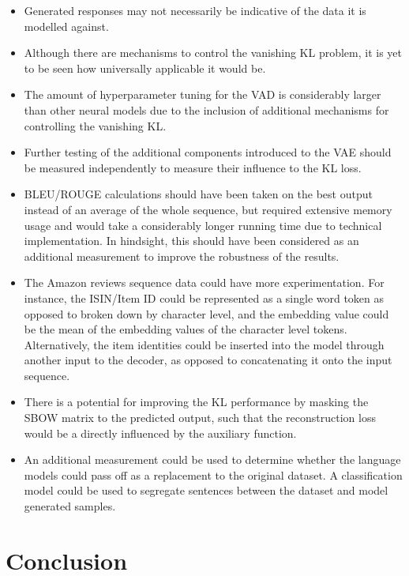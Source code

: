 \documentclass[12pt,twoside]{report}
\begin{document}
\begin{itemize}  
\item Generated responses may not necessarily be indicative of the data it is modelled against.
\item Although there are mechanisms to control the vanishing KL problem, it is yet to be seen how universally applicable it would be.
\item The amount of hyperparameter tuning for the VAD is considerably larger than other neural models due to the inclusion of additional mechanisms for controlling the vanishing KL.
\item Further testing of the additional components introduced to the VAE should be measured independently to measure their influence to the KL loss. 
\item BLEU/ROUGE calculations should have been taken on the best output instead of an average of the whole sequence, but required extensive memory usage and would take a considerably longer running time due to technical implementation. In hindsight, this should have been considered as an additional measurement to improve the robustness of the results.
\item The Amazon reviews sequence data could have more experimentation. For instance, the ISIN/Item ID could be represented as a single word token as opposed to broken down by character level, and the  embedding value could be the mean of the embedding values of the character level tokens. Alternatively, the item identities could be inserted into the model through another input to the decoder, as opposed to concatenating it onto the input sequence. 
\item There is a potential for improving the KL performance by masking the SBOW matrix to the predicted output, such that the reconstruction loss would be a directly influenced by the auxiliary function.
\item An additional measurement could be used to determine whether the language models could pass off as a replacement to the original dataset. A classification model could be used to segregate sentences between the dataset and model generated samples. 
\end{itemize}


\begingroup
\renewcommand{\cleardoublepage}{}
\renewcommand{\clearpage}{}
\chapter{Conclusion}
\endgroup
\end{document}
